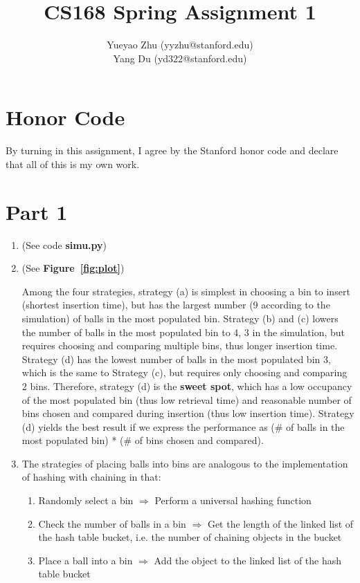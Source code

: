 \documentclass[12pt]{article}
\title{CS168 Spring Assignment 1}
\author{
	Yueyao Zhu	(yyzhu@stanford.edu) \\
	Yang Du (yd322@stanford.edu)
}
\begin{document}
\maketitle

\section*{Honor Code}

By turning in this assignment, I agree by the Stanford honor code and declare
that all of this is my own work.

\section*{Part 1}

\begin{enumerate}[label=(\alph*)]
 	\item (See code \textbf{simu.py})
 	\item (See \textbf{Figure~\ref{fig:plot}})

Among the four strategies, strategy (a) is simplest in choosing a bin to insert (shortest insertion time), but has the largest number (9 according to the simulation) of balls in the most populated bin. Strategy (b) and (c) lowers the number of balls in the most populated bin to 4, 3 in the simulation, but requires choosing and comparing multiple bins, thus longer insertion time. Strategy (d) has the lowest number of balls in the most populated bin 3, which is the same to Strategy (c), but requires only choosing and comparing 2 bins. Therefore, strategy (d) is the \textbf{sweet spot}, which has a low occupancy of the most populated bin (thus low retrieval time) and reasonable number of bins chosen and compared during insertion (thus low insertion time). Strategy (d) yields the best result if we express the performance as (\# of balls in the most populated bin) * (\# of bins chosen and compared).

	\item 

The strategies of placing balls into bins are analogous to the implementation of hashing with chaining in that:
\begin{enumerate}
	\item Randomly select a bin $\Rightarrow{}$ Perform a universal hashing function
	\item Check the number of balls in a bin $\Rightarrow{}$ Get the length of the linked list of the hash table bucket, i.e. the number of chaining objects in the bucket
	\item Place a ball into a bin $\Rightarrow{}$ Add the object to the linked list of the hash table bucket
\end{enumerate}


\end{enumerate}
\end{document}
